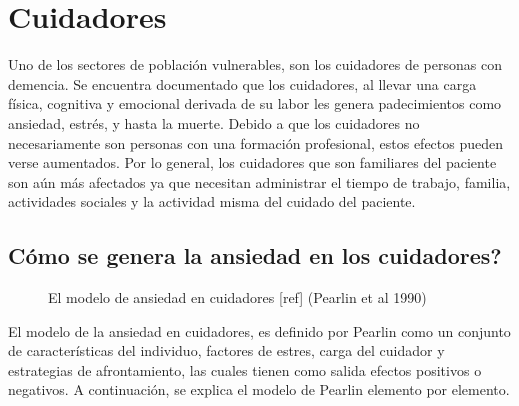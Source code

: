 \section{Cuidadores}\label{secc:caregivers}
Uno de los sectores de poblaci\'on vulnerables, son los cuidadores de personas con demencia. Se encuentra documentado que los cuidadores, al llevar una carga f\'isica, cognitiva y emocional derivada de su labor les genera padecimientos como ansiedad, estr\'es, y hasta la muerte\citep{Chen2013}. Debido a que los cuidadores no necesariamente son personas con una formaci\'on profesional, estos efectos pueden verse aumentados. Por lo general, los cuidadores que son familiares del paciente son a\'un m\'as afectados ya que necesitan administrar el tiempo de trabajo, familia, actividades sociales y la actividad misma del cuidado del paciente.

\subsection{C\'omo se genera la ansiedad en los cuidadores?}\label{secc:caregiverburden}

\begin{figure}[h]
	\centering
	\caption{El modelo de ansiedad en cuidadores [ref] (Pearlin et al 1990)} \label{fig:modeloAnsiedad}
\end{figure}
El modelo de la ansiedad en cuidadores, es definido por Pearlin como un conjunto de caracter\'isticas del individuo, factores de estres, carga del cuidador y estrategias de afrontamiento, las cuales tienen como salida efectos positivos o negativos. A continuaci\'on, se explica el modelo de Pearlin elemento por elemento.
